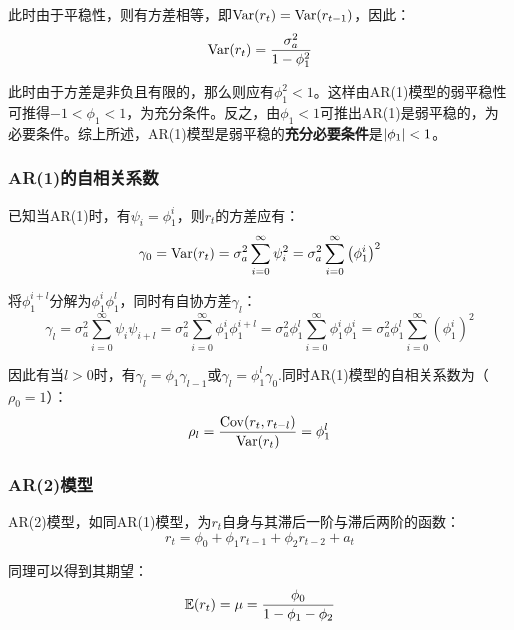 \documentclass[11pt]{article}
\begin{document}
此时由于平稳性，则有方差相等，即$\operatorname{Var}(r_{t}) = \operatorname{Var}(r_{t-1})$，因此：
\begin{equation*}
    \operatorname{Var}(r_{t}) = \frac{\sigma_{a}^{2}}{1-\phi_{1}^{2}}
\end{equation*}

此时由于方差是非负且有限的，那么则应有$\phi_{1}^{2}<1$。这样由AR(1)模型的弱平稳性可推得$-1<\phi_1<1$，为充分条件。反之，由$\phi_1<1$可推出AR(1)是弱平稳的，为必要条件。综上所述，AR(1)模型是弱平稳的\textbf{充分必要条件}是$\left\lvert \phi_1\right\rvert<1$。

\subsubsection*{AR(1)的自相关系数}

已知当AR(1)时，有$\psi_i = \phi_1^i$，则$r_t$的方差应有：
\begin{equation*}
    \gamma_0 = \operatorname{Var}(r_t) = \sigma_{a}^{2}\sum_{i=0}^{\infty} \psi_{i}^{2}
    = \sigma_{a}^{2}\sum_{i=0}^{\infty} \left( \phi_1^{i}\right)^{2}
\end{equation*}

将$\phi_1^{i+l}$分解为$\phi_1^{i}\phi_1^{l}$，同时有自协方差$\gamma_l$：
\begin{equation*}
    \gamma_l = \sigma_{a}^{2} \sum_{i=0}^{\infty} \psi_i \psi_{i+l} 
    = \sigma_{a}^{2} \sum_{i=0}^{\infty} \phi_1^i \phi_1^{i+l} 
    = \sigma_{a}^{2} \phi_1^{l} \sum_{i=0}^{\infty} \phi_1^i \phi_1^{i} 
    = \sigma_{a}^{2} \phi_1^{l} \sum_{i=0}^{\infty} \left( \phi_1^i \right)^2
\end{equation*}

因此有当$l>0$时，有$\gamma_l=\phi_1 \gamma_{l-1}$或$\gamma_l=\phi_1^l \gamma_{0}$.同时AR(1)模型的自相关系数为（$\rho_0=1$）：
\begin{equation*}
    \rho_l = \frac{\operatorname{Cov}(r_t,r_{t-l})}{\operatorname{Var}(r_t)} = \phi_1^l
\end{equation*}

\subsubsection*{AR(2)模型}

AR(2)模型，如同AR(1)模型，为$r_t$自身与其滞后一阶与滞后两阶的函数：
\begin{equation*}
    r_t = \phi_0 + \phi_1 r_{t-1} + \phi_2 r_{t-2} + a_t
\end{equation*}

同理可以得到其期望：
\begin{equation*}
    \mathbb{E}(r_t) = \mu = \frac{\phi_0}{1-\phi_1-\phi_2}
\end{equation*}
\end{document}
